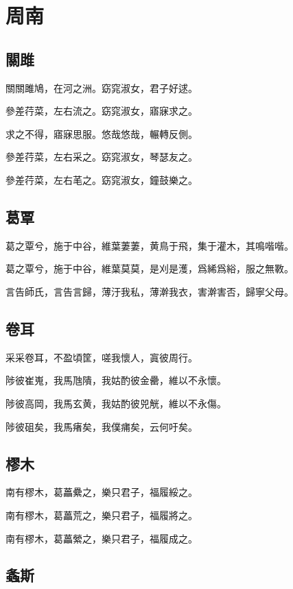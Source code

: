 \section[周南]{周南}

\subsection[關雎]{關雎}

關關雎鳩，在河之洲。窈窕淑女，君子好逑。

參差荇菜，左右流之。窈窕淑女，寤寐求之。

求之不得，寤寐思服。悠哉悠哉，輾轉反側。

參差荇菜，左右采之。窈窕淑女，琴瑟友之。

參差荇菜，左右芼之。窈窕淑女，鐘鼓樂之。

\subsection[葛覃]{葛覃}

葛之覃兮，施于中谷，維葉萋萋，黄鳥于飛，集于灌木，其鳴喈喈。

葛之覃兮，施于中谷，維葉莫莫，是刈是濩，爲絺爲綌，服之無斁。

言告師氏，言告言歸，薄汙我私，薄澣我衣，害澣害否，歸寧父母。

\subsection[卷耳]{卷耳}

采采卷耳，不盈頃筐，嗟我懷人，寘彼周行。

陟彼崔嵬，我馬虺隤，我姑酌彼金罍，維以不永懷。

陟彼高岡，我馬玄黄，我姑酌彼兕觥，維以不永傷。

陟彼砠矣，我馬瘏矣，我僕痡矣，云何吁矣。

\subsection[樛木]{樛木}

南有樛木，葛藟纍之，樂只君子，福履綏之。

南有樛木，葛藟荒之，樂只君子，福履將之。

南有樛木，葛藟縈之，樂只君子，福履成之。

\subsection[螽斯]{螽斯}

